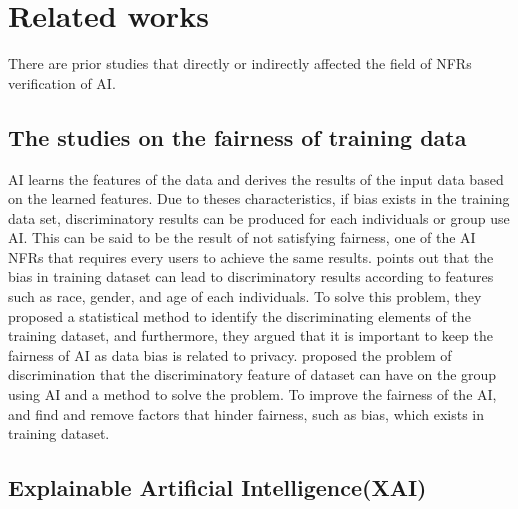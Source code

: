 \documentclass[journal,article,submit,moreauthors,pdftex]{Definitions/mdpi}
\begin{document}
\section{Related works} %

There are prior studies that directly or indirectly affected the field of NFRs verification of AI.


\subsection{The studies on the fairness of training data}

AI learns the features of the data and derives the results of the input data based on the learned features. Due to theses characteristics, if bias exists in the training data set, discriminatory results can be produced for each individuals or group use AI.
This can be said to be the result of not satisfying fairness, one of the AI NFRs that requires every users to achieve the same results.
\cite{fairness-dwork} points out that the bias in training dataset can lead to discriminatory results according to features such as race, gender, and age of each individuals.
To solve this problem, they proposed a statistical method to identify the discriminating elements of the training dataset, and furthermore, they argued that it is important to keep the fairness of AI as data bias is related to privacy.
\cite{fairness-feldman} proposed the problem of discrimination that the discriminatory feature of dataset can have on the group using AI and a method to solve the problem.
To improve the fairness of the AI, \cite{fairness-feldman} and \cite{fairness-microsoft} find and remove factors that hinder fairness, such as bias, which exists in training dataset.

\subsection{Explainable Artificial Intelligence(XAI)}
\end{document}
